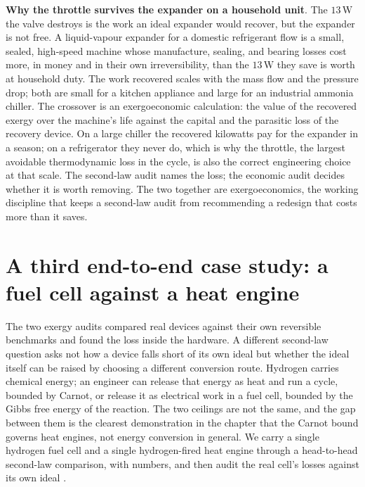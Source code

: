 \begin{mastery}
\textbf{Why the throttle survives the expander on a household unit}. The
$13\,\text{W}$ the valve destroys is the work an ideal expander would
recover, but the expander is not free. A liquid-vapour expander for a
domestic refrigerant flow is a small, sealed, high-speed machine whose
manufacture, sealing, and bearing losses cost more, in money and in their
own irreversibility, than the $13\,\text{W}$ they save is worth at
household duty. The work recovered scales with the mass flow and the
pressure drop; both are small for a kitchen appliance and large for an
industrial ammonia chiller. The crossover is an exergoeconomic
calculation: the value of the recovered exergy over the machine's life
against the capital and the parasitic loss of the recovery device. On a
large chiller the recovered kilowatts pay for the expander in a season;
on a refrigerator they never do, which is why the throttle, the largest
avoidable thermodynamic loss in the cycle, is also the correct
engineering choice at that scale. The second-law audit names the loss;
the economic audit decides whether it is worth removing. The two together
are exergoeconomics, the working discipline that keeps a second-law audit
from recommending a redesign that costs more than it saves.
\end{mastery}

\section{A third end-to-end case study: a fuel cell against a heat engine}

The two exergy audits compared real devices against their own reversible
benchmarks and found the loss inside the hardware. A different second-law
question asks not how a device falls short of its own ideal but whether the
ideal itself can be raised by choosing a different conversion route. Hydrogen
carries chemical energy; an engineer can release that energy as heat and run a
cycle, bounded by Carnot, or release it as electrical work in a fuel cell,
bounded by the Gibbs free energy of the reaction. The two ceilings are not the
same, and the gap between them is the clearest demonstration in the chapter that
the Carnot bound governs heat engines, not energy conversion in general. We
carry a single hydrogen fuel cell and a single hydrogen-fired heat engine
through a head-to-head second-law comparison, with numbers, and then audit the
real cell's losses against its own ideal \cite{text:cengel-boles}.

